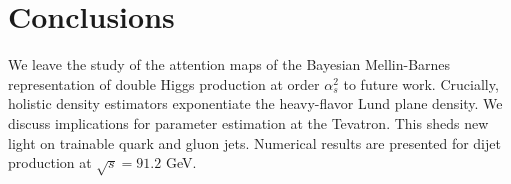 \section{Conclusions}\label{sec:conclusions}

We leave the study of the attention maps of the Bayesian Mellin-Barnes
representation of double Higgs production at order $\alpha_s^2$ to
future work. Crucially, holistic density estimators exponentiate the
heavy-flavor Lund plane density. We discuss implications for parameter
estimation at the Tevatron. This sheds new light on trainable quark and
gluon jets. Numerical results are presented for dijet production at
$\sqrt{s} = 91.2$ GeV.

